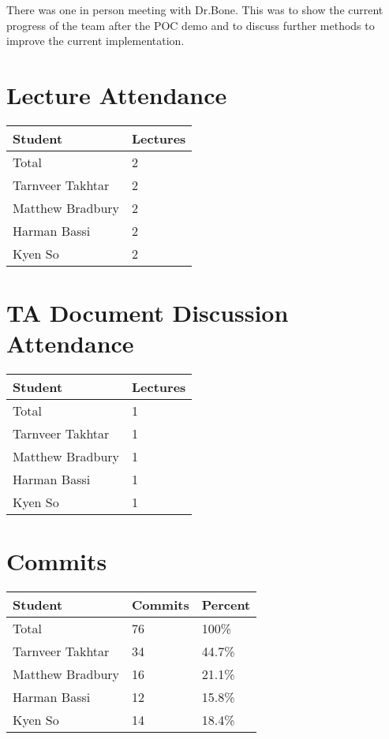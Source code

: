 \documentclass{article}
\begin{document}
There was one in person meeting with Dr.Bone. 
This was to show the current progress of the team after the POC demo and to discuss 
further methods to improve the current implementation.

\section{Lecture Attendance}

\begin{table}[H]
\centering
\begin{tabular}{ll}
\toprule
\textbf{Student} & \textbf{Lectures}\\
\midrule
Total & 2\\
Tarnveer Takhtar & 2\\
Matthew Bradbury & 2\\
Harman Bassi & 2\\
Kyen So & 2\\
\bottomrule
\end{tabular}
\end{table}

\section{TA Document Discussion Attendance}


\begin{table}[H]
\centering
\begin{tabular}{ll}
\toprule
\textbf{Student} & \textbf{Lectures}\\
\midrule
Total & 1\\
Tarnveer Takhtar & 1\\
Matthew Bradbury & 1\\
Harman Bassi & 1\\
Kyen So & 1\\
\bottomrule
\end{tabular}
\end{table}

\section{Commits}

\begin{table}[H]
\centering
\begin{tabular}{lll}
\toprule
\textbf{Student} & \textbf{Commits} & \textbf{Percent}\\
\midrule
Total & 76 & 100\% \\
Tarnveer Takhtar & 34 & 44.7\%\\
Matthew Bradbury & 16 & 21.1\%\\
Harman Bassi & 12 & 15.8\%\\
Kyen So & 14 & 18.4\%\\
\bottomrule
\end{tabular}
\end{table}
\end{document}
